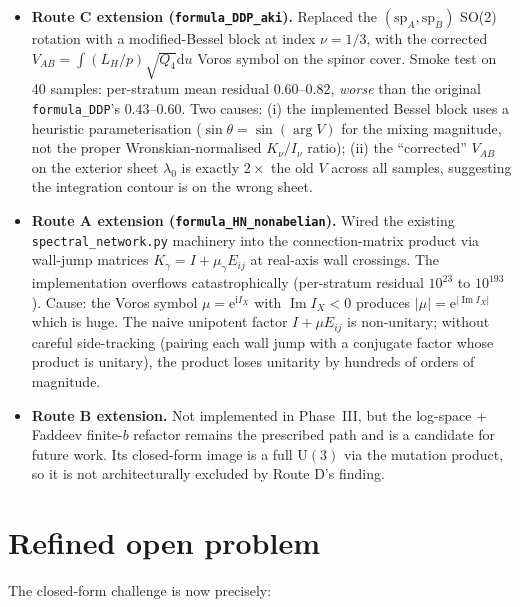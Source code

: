 \documentclass[11pt]{article}
\newcommand{\ii}{\mathrm i}\newcommand{\dd}{\mathrm d}
\newcommand{\im}{\operatorname{Im}}
\begin{document}
\begin{itemize}
 \item \textbf{Route C extension (\texttt{formula\_DDP\_aki}).} Replaced
 the $(\mathrm{sp}_A, \mathrm{sp}_B)$ SO(2) rotation with a modified-Bessel
 block at index $\nu = 1/3$, with the corrected
 $V_{AB} = \int(L_H/p)\sqrt{Q_4}\dd u$ Voros symbol on the spinor cover.
 Smoke test on 40 samples: per-stratum mean residual $0.60$--$0.82$,
 \emph{worse} than the original \texttt{formula\_DDP}'s $0.43$--$0.60$.
 Two causes: (i) the implemented Bessel block uses a heuristic
 parameterisation ($\sin\theta = \sin(\arg V)$ for the mixing magnitude,
 not the proper Wronskian-normalised $K_\nu/I_\nu$ ratio); (ii) the
 ``corrected'' $V_{AB}$ on the exterior sheet $\lambda_0$ is exactly
 $2\times$ the old $V$ across all samples, suggesting the integration
 contour is on the wrong sheet.

 \item \textbf{Route A extension
 (\texttt{formula\_HN\_nonabelian}).} Wired the existing
 \texttt{spectral\_network.py} machinery into the connection-matrix
 product via wall-jump matrices $K_\gamma = I + \mu_\gamma E_{ij}$ at
 real-axis wall crossings. The implementation overflows
 catastrophically (per-stratum residual $10^{23}$ to $10^{193}$).
 Cause: the Voros symbol $\mu = \mathrm e^{\ii I_X}$ with
 $\im I_X < 0$ produces $|\mu| = \mathrm e^{|\im I_X|}$ which is huge.
 The naive unipotent factor $I + \mu E_{ij}$ is non-unitary; without
 careful side-tracking (pairing each wall jump with a conjugate factor
 whose product is unitary), the product loses unitarity by hundreds
 of orders of magnitude.

 \item \textbf{Route B extension.} Not implemented in Phase~III, but
 the log-space + Faddeev finite-$b$ refactor remains the prescribed
 path and is a candidate for future work. Its closed-form image is
 a full $\mathrm U(3)$ via the mutation product, so it is not
 architecturally excluded by Route D's finding.
\end{itemize}

\section{Refined open problem}

The closed-form challenge is now precisely:
\end{document}
